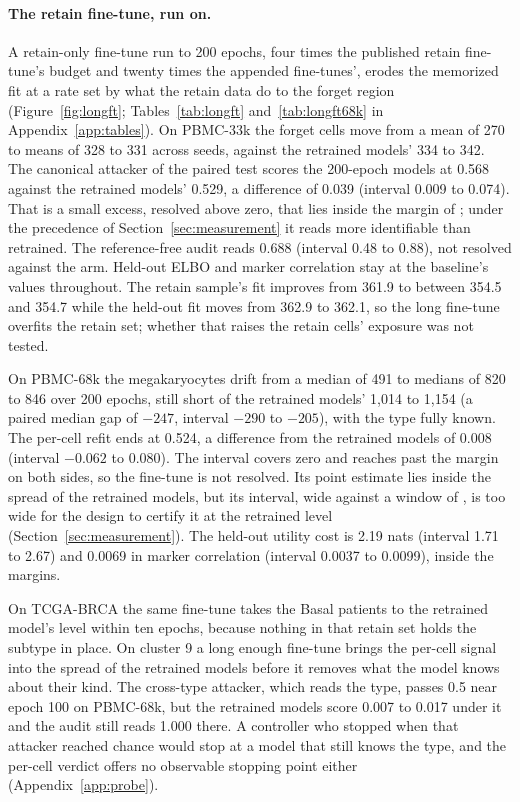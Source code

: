 \documentclass{article}
\begin{document}
\paragraph{The retain fine-tune, run on.} A retain-only fine-tune run to 200 epochs, four times the published retain fine-tune's budget and twenty times the appended fine-tunes', erodes the memorized fit at a rate set by what the retain data do to the forget region (Figure~\ref{fig:longft}; Tables~\ref{tab:longft} and~\ref{tab:longft68k} in Appendix~\ref{app:tables}). On PBMC-33k the forget cells move from a mean of 270 to means of 328 to 331 across seeds, against the retrained models' 334 to 342. The canonical attacker of the paired test scores the 200-epoch models at 0.568 against the retrained models' 0.529, a difference of 0.039 (interval 0.009 to 0.074). That is a small excess, resolved above zero, that lies inside the margin of ; under the precedence of Section~\ref{sec:measurement} it reads more identifiable than retrained. The reference-free audit reads 0.688 (interval 0.48 to 0.88), not resolved against the arm. Held-out ELBO and marker correlation stay at the baseline's values throughout. The retain sample's fit improves from 361.9 to between 354.5 and 354.7 while the held-out fit moves from 362.9 to 362.1, so the long fine-tune overfits the retain set; whether that raises the retain cells' exposure was not tested.

On PBMC-68k the megakaryocytes drift from a median of 491 to medians of 820 to 846 over 200 epochs, still short of the retrained models' 1,014 to 1,154 (a paired median gap of $-247$, interval $-290$ to $-205$), with the type fully known. The per-cell refit ends at 0.524, a difference from the retrained models of 0.008 (interval $-0.062$ to 0.080). The interval covers zero and reaches past the margin on both sides, so the fine-tune is not resolved. Its point estimate lies inside the spread of the retrained models, but its interval,  wide against a window of , is too wide for the design to certify it at the retrained level (Section~\ref{sec:measurement}). The held-out utility cost is 2.19 nats (interval 1.71 to 2.67) and 0.0069 in marker correlation (interval 0.0037 to 0.0099), inside the margins.

On TCGA-BRCA the same fine-tune takes the Basal patients to the retrained model's level within ten epochs, because nothing in that retain set holds the subtype in place. On cluster 9 a long enough fine-tune brings the per-cell signal into the spread of the retrained models before it removes what the model knows about their kind. The cross-type attacker, which reads the type, passes 0.5 near epoch 100 on PBMC-68k, but the retrained models score 0.007 to 0.017 under it and the audit still reads 1.000 there. A controller who stopped when that attacker reached chance would stop at a model that still knows the type, and the per-cell verdict offers no observable stopping point either (Appendix~\ref{app:probe}).
\end{document}
